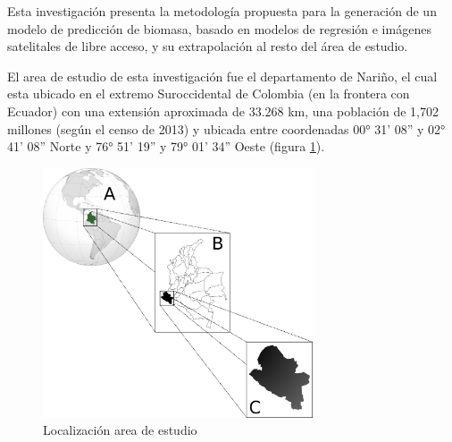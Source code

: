 Esta investigación presenta la metodología propuesta para la generación de un modelo de predicción de biomasa, basado en modelos de regresión e imágenes satelitales de libre acceso, y su extrapolación al resto del área de estudio.

El area de estudio de esta investigación fue el departamento de Nariño, el cual esta ubicado en el extremo Suroccidental de Colombia (en la frontera con Ecuador) con una extensión aproximada de 33.268 km, una población de 1,702 millones (según
el censo de 2013) y ubicada entre coordenadas 00° 31' 08'' y 02° 41' 08'' Norte y 76° 51' 19'' y 79° 01' 34'' Oeste (figura  \ref{fig:locationNarino}).

\begin{figure}
  \centering
  \includegraphics[width = 8cm]{locationNarino.png}
  \caption{Localización area de estudio}
  \label{fig:locationNarino}
\end{figure}
